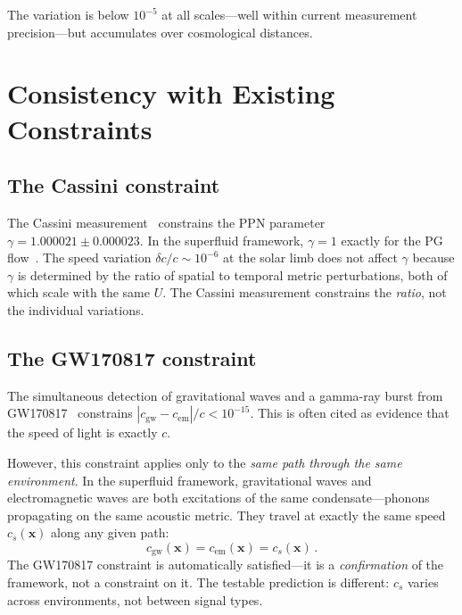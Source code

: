 \documentclass[12pt, a4paper]{article}
\begin{document}
The variation is below $10^{-5}$ at all scales---well
within current measurement precision---but
accumulates over cosmological distances.


\section{Consistency with Existing Constraints}
\label{sec:constraints}

\subsection{The Cassini constraint}

The Cassini measurement~\cite{bertotti_2003}
constrains the PPN parameter $\gamma = 1.000021 \pm
0.000023$. In the superfluid framework, $\gamma = 1$
exactly for the PG flow~\cite{kulangiev_2026a}. The
speed variation $\delta c/c \sim 10^{-6}$ at the
solar limb does not affect $\gamma$ because $\gamma$
is determined by the ratio of spatial to temporal
metric perturbations, both of which scale with the
same $U$. The Cassini measurement constrains the
\emph{ratio}, not the individual variations.

\subsection{The GW170817 constraint}

The simultaneous detection of gravitational waves
and a gamma-ray burst from
GW170817~\cite{abbott_2017} constrains
$|c_{\mathrm{gw}} - c_{\mathrm{em}}|/c <
10^{-15}$. This is often cited as evidence that
the speed of light is exactly $c$.

However, this constraint applies only to the
\emph{same path through the same environment}. In
the superfluid framework, gravitational waves and
electromagnetic waves are both excitations of the
same condensate---phonons propagating on the same
acoustic metric. They travel at exactly the same
speed $c_s(\mathbf{x})$ along any given path:
\begin{equation}
    c_{\mathrm{gw}}(\mathbf{x})
    = c_{\mathrm{em}}(\mathbf{x})
    = c_s(\mathbf{x})\,.
\label{eq:cgw_cem}
\end{equation}
The GW170817 constraint is automatically
satisfied---it is a \emph{confirmation} of the
framework, not a constraint on it. The testable
prediction is different: $c_s$ varies across
environments, not between signal types.
\end{document}
